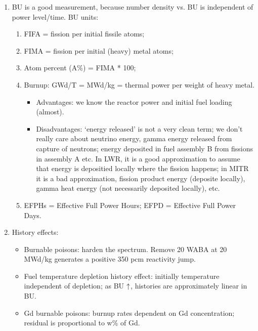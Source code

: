 \documentclass{school-22.211-notes}
\begin{document}
\begin{enumerate}
\item BU is a good measurement, because number density vs. BU is independent of power level/time. BU units: 
\begin{enumerate}
\item FIFA = fission per initial fissile atoms;
\item FIMA = fission per initial (heavy) metal atoms;
\item Atom percent (A\%) = FIMA * 100;
\item Burnup: GWd/T = MWd/kg = thermal power per weight of heavy metal. 
  \begin{itemize}
    \item Advantages: we know the reactor power and initial fuel loading (almost). 
    \item Disadvantages: `energy released' is not a very clean term; we don't really care about neutrino energy, gamma energy released from capture of neutrons; energy deposited in fuel assembly B from fissions in assembly A etc. In LWR, it is a good approximation to assume that energy is depositied locally where the fission happens; in MITR it is a bad approximation, fission product energy (deposite locally), gamma heat energy (not necessarily deposited locally), etc. 
  \end{itemize}
\item EFPHs = Effective Full Power Hours; EFPD = Effective Full Power Days. 
\end{enumerate}

\item History effects: 
  \begin{itemize}
    \item Burnable poisons: harden the spectrum. Remove 20 WABA at 20 MWd/kg generates a positive 350 pcm reactivity jump. 
    \item Fuel temperature depletion history effect: initially temperature independent of depletion; as BU $\uparrow$, histories are approximately linear in BU. 
    \item Gd burnable poisons: burnup rates dependent on Gd concentration; residual is proportional to w\% of Gd. 
  \end{itemize}
\end{enumerate}
\end{document}
